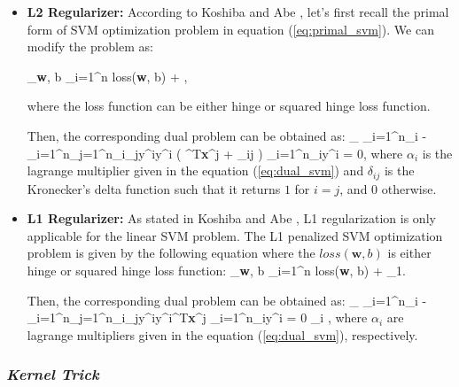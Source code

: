 \begin{itemize}
	\item \textbf{L2 Regularizer:} According to Koshiba and  Abe \cite[pg.~2054-2059]{svm_penalty}, let's first recall the primal form of SVM optimization problem in equation (\ref{eq:primal_svm}). We can modify the problem as:
	
	\be
	\label{eq:l2_svm_primal}
	\min_{\textbf{w}, b} \sum_{i=1}^{n} loss(\textbf{w}, b) + \lambda {},
	\ee
	
	
	where the loss function can be either hinge or squared hinge loss function.
	
	Then, the corresponding dual problem can be obtained as:
	\be
	\label{eq:l2_svm_dual}
	\max_{\alpha} \sum_{i=1}^{n}\alpha_{i} - \sum_{i=1}^{n}\sum_{j=1}^{n}\alpha_{i}\alpha_{j}\:y^{i}y^{i} \big ( ^{T}\textbf{x}^{j} + \lambda \delta_{ij} \big ) \quad {} \:\:\sum_{i=1}^{n}\alpha_{i}y^{i} = 0\:,
	\ee
	where $\alpha_{i}$ is the lagrange multiplier given in the equation (\ref{eq:dual_svm}) and $\delta_{ij}$ is the Kronecker’s delta function such that it returns $1$ for $i=j$, and $0$ otherwise.
	
	\item \textbf{L1 Regularizer:}
	As stated in Koshiba and  Abe \cite[pg.~2054-2059]{svm_penalty}, L1 regularization is only applicable for the linear SVM problem. The L1 penalized SVM optimization problem is given by the following equation where the $loss(\textbf{w}, b)$ is either hinge or squared hinge loss function:
	\be
	\label{eq:l1_svm_primal}
	\min_{\textbf{w}, b} \sum_{i=1}^{n} loss(\textbf{w}, b) + \lambda  {}_{1}\:.
	\ee
	
	Then, the corresponding dual problem can be obtained as:
	\be
	\label{eq:l1_svm_dual}
	\max_{\alpha} \sum_{i=1}^{n}\alpha_{i} - \sum_{i=1}^{n}\sum_{j=1}^{n}\alpha_{i}\alpha_{j}\:y^{i}y^{i}^{T}\textbf{x}^{j} \quad  {} \:\:\sum_{i=1}^{n}\alpha_{i}y^{i} = 0 \:\:\:\: \alpha_{i} \leq {}\:,
	\ee
	where $\alpha_{i}$ are lagrange multipliers given in the equation (\ref{eq:dual_svm}), respectively.
	
	
\end{itemize}


\subsubsection*{\textit{Kernel Trick}}

